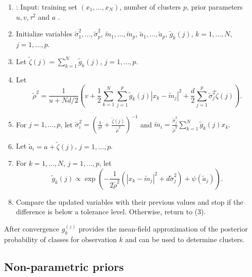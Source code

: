 \begin{algorithm}
\label{alg:mean.field.mog}
\begin{enumerate}[label=(\arabic*), wide=0.5cm]
\item: Input: training set $(x_1, \ldots, x_N)$, number of clusters $p$, prior parameters $u, v, \tau^2$ and $a$ .
\item Initialize variables $\tilde \sigma^2_1, \ldots, \tilde \sigma^2_p$, $\tilde m_1, \ldots, \tilde m_p$, $\tilde a_1, \ldots, \tilde a_p$, $\tilde g_k(j)$, $k=1, \ldots, N$, $j=1, \ldots, p$. 
\item Let  $\tilde \zeta(j) = \sum_{k=1}^N \tilde g_k(j)$, $j=1, \ldots, p$.
\item Let 
\[
\tilde \rho^2 = \frac{1}{u+Nd/2} \left(v + \frac12 \sum_{k=1}^N \sum_{j=1}^p \tilde g_k(j) |x_k-\tilde m_j|^2 + \frac{d}2 \sum_{j=1}^p \tilde\sigma_j^2\tilde\zeta(j)\right).
\]
\item For $j=1, \ldots, p$, let $\tilde \sigma^2_i =  \left(\frac1{\tau^2} +\frac{\tilde\zeta(j)}{\tilde \rho^2} \right)^{-1}$ and $\tilde m_i = \frac{\tilde\sigma_j^2}{\tilde \rho^2} \sum_{k=1}^N \tilde g_k(j) x_k$.
\item Let $\tilde a_i = a + \tilde \zeta(j) $, $j=1, \ldots, p$.
\item For $k=1, \ldots, N$, $j=1, \ldots, p$, let
\[
\tilde g_k(j) \propto \exp\left(- \frac1{2\tilde\rho^2}  \left(|x_k-\tilde m_j|^2 + d \tilde\sigma_j^2\right) + \psi(\tilde a_j) \right).
\]
\item Compare the updated variables with their previous values and stop if the difference is below a tolerance level. Otherwise, return to (3).
\end{enumerate}
\end{algorithm}
After convergence $g_k^{(z)}$ provides the mean-field approximation of the posterior probability of classes for observation $k$ and can be used to determine clusters.

\subsection{Non-parametric priors}
\label{sec:cluster.npb}
